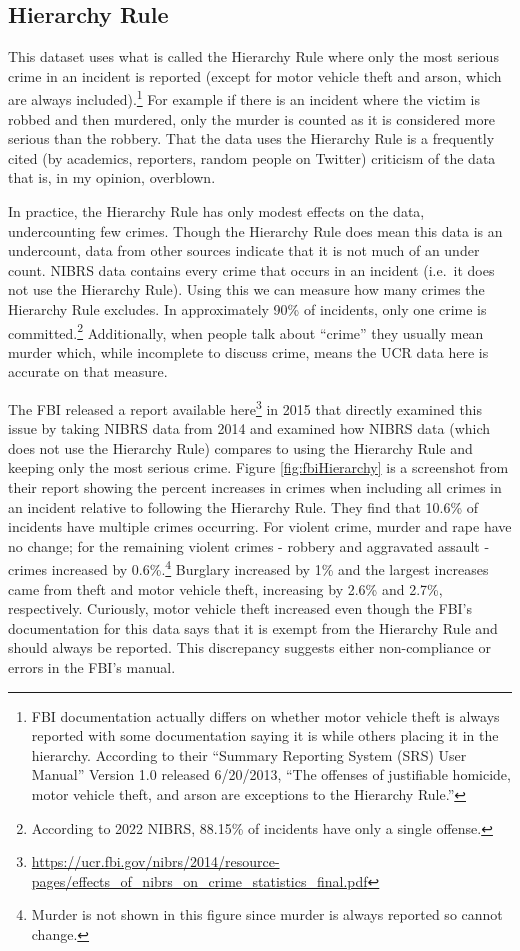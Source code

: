 \documentclass[
]{krantz}
\renewcommand{\href}[2]{#2\footnote{\url{#1}}}
\begin{document}
\subsection{Hierarchy Rule}\label{hierarchy}

This dataset uses what is called the Hierarchy Rule where
only the most serious crime in an incident is reported
(except for motor vehicle theft and arson, which are always
included).\footnote{FBI documentation actually differs on
  whether motor vehicle theft is always reported with some
  documentation saying it is while others placing it in the
  hierarchy. According to their ``Summary Reporting System
  (SRS) User Manual'' Version 1.0 released 6/20/2013, ``The
  offenses of justifiable homicide, motor vehicle theft, and
  arson are exceptions to the Hierarchy Rule.''} For example
if there is an incident where the victim is robbed and then
murdered, only the murder is counted as it is considered
more serious than the robbery. That the data uses the
Hierarchy Rule is a frequently cited (by academics,
reporters, random people on Twitter) criticism of the data
that is, in my opinion, overblown.

In practice, the Hierarchy Rule has only modest effects on
the data, undercounting few crimes. Though the Hierarchy
Rule does mean this data is an undercount, data from other
sources indicate that it is not much of an under count.
NIBRS data contains every crime that occurs in an incident
(i.e.~it does not use the Hierarchy Rule). Using this we can
measure how many crimes the Hierarchy Rule excludes. In
approximately 90\% of incidents, only one crime is
committed.\footnote{According to 2022 NIBRS, 88.15\% of
  incidents have only a single offense.} Additionally, when
people talk about ``crime'' they usually mean murder which,
while incomplete to discuss crime, means the UCR data here
is accurate on that measure.

The FBI released a report
\href{https://ucr.fbi.gov/nibrs/2014/resource-pages/effects_of_nibrs_on_crime_statistics_final.pdf}{available
here} in 2015 that directly examined this issue by taking
NIBRS data from 2014 and examined how NIBRS data (which does
not use the Hierarchy Rule) compares to using the Hierarchy
Rule and keeping only the most serious crime. Figure
\ref{fig:fbiHierarchy} is a screenshot from their report
showing the percent increases in crimes when including all
crimes in an incident relative to following the Hierarchy
Rule. They find that 10.6\% of incidents have multiple
crimes occurring. For violent crime, murder and rape have no
change; for the remaining violent crimes - robbery and
aggravated assault - crimes increased by 0.6\%.\footnote{Murder
  is not shown in this figure since murder is always
  reported so cannot change.} Burglary increased by 1\% and
the largest increases came from theft and motor vehicle
theft, increasing by 2.6\% and 2.7\%, respectively.
Curiously, motor vehicle theft increased even though the
FBI's documentation for this data says that it is exempt
from the Hierarchy Rule and should always be reported. This
discrepancy suggests either non-compliance or errors in the
FBI's manual.
\end{document}

